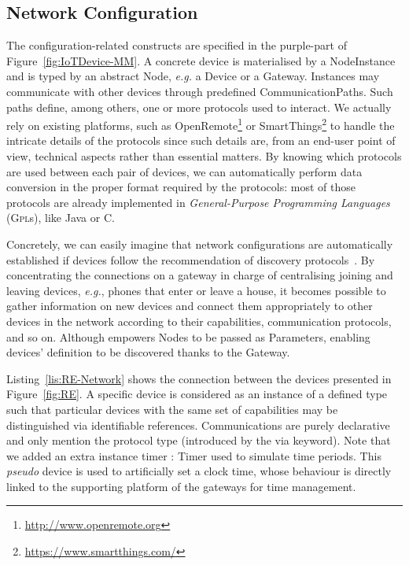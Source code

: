 \subsection{Network Configuration}
\label{sec:IoTDSL-NetworkConfiguration}

The configuration-related constructs are specified in the purple-part of Figure~\ref{fig:IoTDevice-MM}. A concrete device is materialised by a \textsf{NodeInstance} and is typed by an abstract \textsf{Node}, \textit{e.g.} a \textsf{Device} or a \textsf{Gateway}. Instances may communicate with other \IOT devices through predefined \textsf{CommunicationPath}s. Such paths define, among others, one or more protocols used to interact. We actually rely on existing platforms, such as OpenRemote\footnote{\url{http://www.openremote.org}} or SmartThings\footnote{\url{https://www.smartthings.com/}} to handle the intricate details of the protocols since such details are, from an end-user point of view, technical aspects rather than essential matters. By knowing which protocols are used between each pair of devices, we can automatically perform data conversion in the proper format required by the protocols: most of those protocols are already implemented in \textit{General-Purpose Programming Languages} (\textsc{Gpl}s), like Java or C.

Concretely, we can easily imagine that network configurations are automatically established if devices follow the recommendation of discovery protocols~\cite{J:AlFuqaha-etAl:2014}. By concentrating the connections on a gateway in charge of centralising joining and leaving devices, \textit{e.g.}, phones that enter or leave a house, it becomes possible to gather information on new devices and connect them appropriately to other devices in the network according to their capabilities, communication protocols, and so on. Although \IOTDSL empowers \textsf{Node}s to be passed as \textsf{Parameter}s, enabling devices' definition to be discovered thanks to the \textsf{Gateway}.

Listing~\ref{lis:RE-Network} shows the connection between the devices presented in Figure~\ref{fig:RE}. A specific device is considered as an instance of a defined type such that particular devices with the same set of capabilities may be distinguished via identifiable references. Communications are purely declarative and only mention the protocol type (introduced by the \textsf{via} keyword). Note that we added an extra instance \textsf{timer : Timer} used to simulate time periods. This \textit{pseudo} device is used to artificially set a clock time, whose behaviour is directly linked to the supporting platform of the gateways for time management.
	
